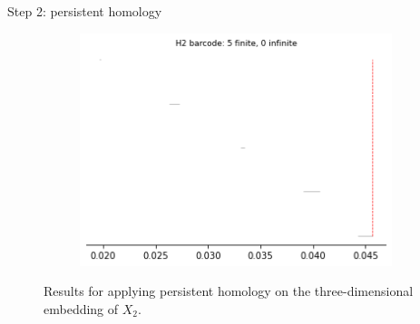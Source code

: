 \documentclass[xcolor={dvipsnames,svgnames}]{beamer}
\begin{document}
\begin{frame}{Step 2: persistent homology}
\begin{figure}[H]
\begin{subfigure}[b]{0.2\textwidth}
\includegraphics[width=\textwidth]{figures/X2_H2_barcode.png}
 \caption{}
\end{subfigure}
\caption{\scriptsize Results for applying persistent homology on the three-dimensional embedding of $X_2$.}
\end{figure}
\end{frame}
\end{document}
